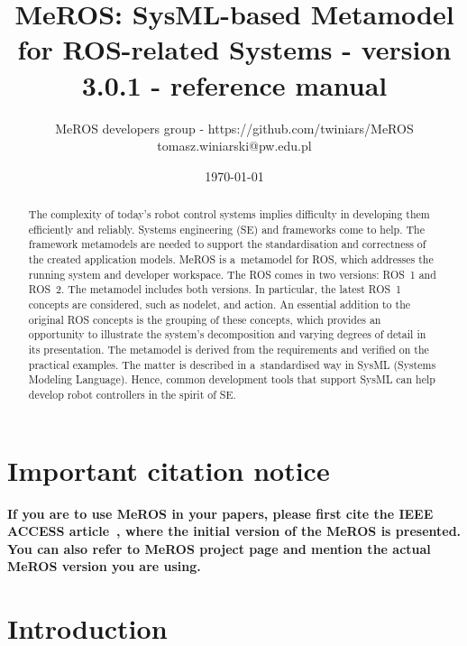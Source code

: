 \documentclass[11pt,oneside,a4paper]{report}
\begin{document}
	
	\title{MeROS: SysML-based Metamodel for ROS-related Systems - version 3.0.1 - reference manual}
\author{MeROS developers group - https://github.com/twiniars/MeROS \\ tomasz.winiarski@pw.edu.pl}
\date{\today}
\maketitle


	\begin{abstract}
		The complexity of today's robot control systems implies difficulty in developing them efficiently and reliably. Systems engineering (SE) and frameworks come to help. The framework metamodels are needed to support the standardisation and correctness of the created application models. MeROS is a~metamodel for ROS, which addresses the running system and developer workspace. The ROS comes in two versions: ROS~1 and ROS~2. The metamodel includes both versions. In particular, the latest ROS~1 concepts are considered, such as nodelet, and action. An essential addition to the original ROS concepts is the grouping of these concepts, which provides an opportunity to illustrate the system's decomposition and varying degrees of detail in its presentation. The metamodel is derived from the requirements and verified on the practical examples. The matter is described in a~standardised way in SysML (Systems Modeling Language). Hence, common development tools that support SysML can help develop robot controllers in the spirit of SE.
	\end{abstract}
	
	
	
	\maketitle
	
\chapter*{Important citation notice}

\textbf{If you are to use MeROS in your papers, please first cite the IEEE ACCESS  article~\cite{meros-access}, where the initial version of the MeROS is presented. You can also refer to MeROS project page \cite{meros-www} and mention the actual MeROS version you are using.}
	
	
\chapter{Introduction}
\label{ch:intro}	
\end{document}
